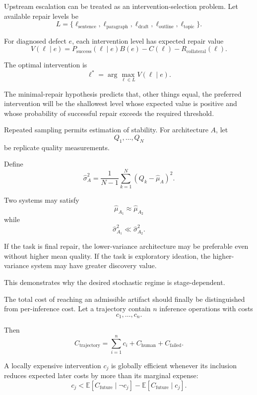 \documentclass[11pt]{article}
\begin{document}
Upstream escalation can be treated as an intervention-selection problem. Let available repair levels be
\[
    L
    =
    \{
        \ell_{\mathrm{sentence}},
        \ell_{\mathrm{paragraph}},
        \ell_{\mathrm{draft}},
        \ell_{\mathrm{outline}},
        \ell_{\mathrm{topic}}
    \}.
\]

For diagnosed defect \(e\), each intervention level has expected repair value
\[
    V(\ell\mid e)
    =
    P_{\mathrm{success}}(\ell\mid e)
    B(e)
    -
    C(\ell)
    -
    R_{\mathrm{collateral}}(\ell).
\]

The optimal intervention is
\[
    \ell^\ast
    =
    \arg\max_{\ell\in L}
    V(\ell\mid e).
\]

The minimal-repair hypothesis predicts that, other things equal, the preferred intervention will be the shallowest level whose expected value is positive and whose probability of successful repair exceeds the required threshold.

Repeated sampling permits estimation of stability. For architecture \(A\), let
\[
    Q_1,\ldots,Q_N
\]
be replicate quality measurements.

Define
\[
    \widehat{\sigma}_A^2
    =
    \frac{1}{N-1}
    \sum_{k=1}^{N}
    (Q_k-\widehat{\mu}_A)^2.
\]

Two systems may satisfy
\[
    \widehat{\mu}_{A_1}
    \approx
    \widehat{\mu}_{A_2}
\]
while
\[
    \widehat{\sigma}_{A_1}^2
    \ll
    \widehat{\sigma}_{A_2}^2.
\]

If the task is final repair, the lower-variance architecture may be preferable even without higher mean quality. If the task is exploratory ideation, the higher-variance system may have greater discovery value.

This demonstrates why the desired stochastic regime is stage-dependent.

The total cost of reaching an admissible artifact should finally be distinguished from per-inference cost. Let a trajectory contain \(n\) inference operations with costs
\[
    c_1,\ldots,c_n.
\]

Then
\[
    C_{\mathrm{trajectory}}
    =
    \sum_{i=1}^{n}c_i
    +
    C_{\mathrm{human}}
    +
    C_{\mathrm{failed}}.
\]

A locally expensive intervention \(c_j\) is globally efficient whenever its inclusion reduces expected later costs by more than its marginal expense:
\[
    c_j
    <
    \mathbb{E}
    [
        C_{\mathrm{future}}
        \mid
        \neg c_j
    ]
    -
    \mathbb{E}
    [
        C_{\mathrm{future}}
        \mid
        c_j
    ].
\]
\end{document}
